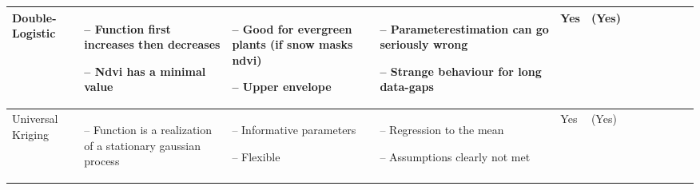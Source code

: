 \begin{table}[!ht]
\begin{tabular}{p{1.6cm}p{3.3cm}p{3.3cm}p{3.4cm}p{0.4cm}p{0.4cm}p{3cm}p{3cm}p{3cm}p{3cm}p{2.7cm}p{3cm}|}
		Double-Logistic                                                                                                                                              &
		\begin{cptitemize} \item[--]  Function first increases then decreases \item[--]  Ndvi has a minimal value                            \end{cptitemize}        &
		\begin{cptitemize} \item[--]  Good for evergreen plants (if snow masks ndvi) \item[--]  Upper envelope                                \end{cptitemize}        &
		\begin{cptitemize} \item[--]  Parameterestimation can go seriously wrong \item[--]  Strange behaviour for long data-gaps             \end{cptitemize}        &
		Yes                                                                                                                                                          &
		(Yes)                                                                                                                                                         \\ \hline%

		Universal Kriging                                                                                                                                            &
		\begin{cptitemize} \item[--]  Function is a realization of a stationary gaussian process                                      \end{cptitemize}               &
		\begin{cptitemize} \item[--]  Informative parameters \item[--]  Flexible                                                             \end{cptitemize}        &
		\begin{cptitemize} \item[--]  Regression to the mean \item[--]  Assumptions clearly not met                                          \end{cptitemize}        &
		Yes                                                                                                                                                          &
		(Yes)                                                                                                                                                         \\ %


\end{tabular}
\end{table}

